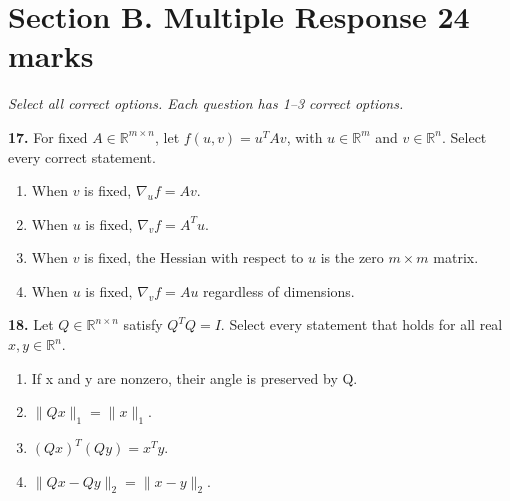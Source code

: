 \documentclass[11pt,a4paper]{article}
\begin{document}
\newpage\section*{Section B. Multiple Response \hfill 24 marks}
\textit{Select all correct options. Each question has 1--3 correct options.}\par
\par\noindent\begin{minipage}{\linewidth}
\textbf{17.} For fixed \(A\in\mathbb R^{m\times n}\), let \(f(u,v)=u^TAv\), with \(u\in\mathbb R^m\) and \(v\in\mathbb R^n\). Select every correct statement.
\begin{enumerate}[label=(\Alph*),leftmargin=8mm,itemsep=2pt,topsep=2pt]
\item When \(v\) is fixed, \(\nabla_u f=Av\).
\item When \(u\) is fixed, \(\nabla_v f=A^Tu\).
\item When \(v\) is fixed, the Hessian with respect to \(u\) is the zero \(m\times m\) matrix.
\item When \(u\) is fixed, \(\nabla_v f=Au\) regardless of dimensions.
\end{enumerate}

\end{minipage}\par\vspace{3mm}
\par\noindent\begin{minipage}{\linewidth}
\textbf{18.} Let \(Q\in\mathbb R^{n\times n}\) satisfy \(Q^TQ=I\). Select every statement that holds for all real \(x,y\in\mathbb R^n\).
\begin{enumerate}[label=(\Alph*),leftmargin=8mm,itemsep=2pt,topsep=2pt]
\item If x and y are nonzero, their angle is preserved by Q.
\item \(\|Qx\|_1=\|x\|_1\).
\item \((Qx)^T(Qy)=x^Ty\).
\item \(\|Qx-Qy\|_2=\|x-y\|_2\).
\end{enumerate}

\end{minipage}\par\vspace{3mm}
\end{document}
